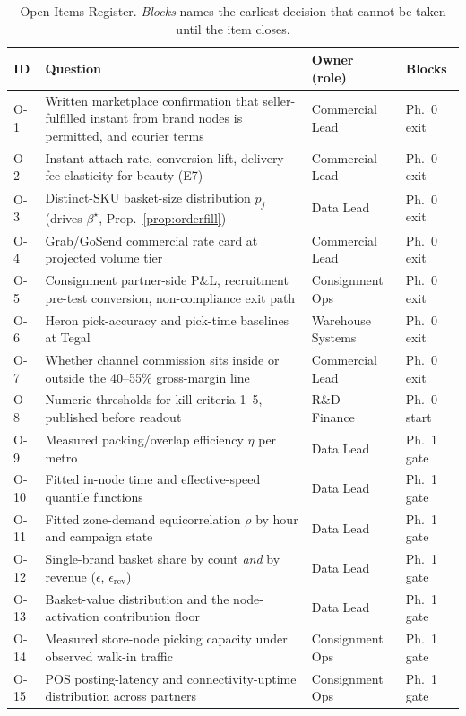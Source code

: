 \documentclass[10pt,twocolumn,letterpaper]{article}
\theoremstyle{definition}
\begin{document}
\begin{table}[t]
\caption{Open Items Register. \emph{Blocks} names the earliest decision that cannot be taken until the item closes.}
\label{tab:open}
\centering\footnotesize
\begin{tabular}{@{}p{0.5cm}p{4.0cm}p{1.5cm}p{1.0cm}@{}}
\toprule
\textbf{ID} & \textbf{Question} & \textbf{Owner (role)} & \textbf{Blocks}\\
\midrule
O-1 & Written marketplace confirmation that seller-fulfilled instant from brand nodes is permitted, and courier terms & Commercial Lead & Ph.\ 0 exit\\
O-2 & Instant attach rate, conversion lift, delivery-fee elasticity for beauty (E7) & Commercial Lead & Ph.\ 0 exit\\
O-3 & Distinct-SKU basket-size distribution $p_j$ (drives $\beta^\star$, Prop.~\ref{prop:orderfill}) & Data Lead & Ph.\ 0 exit\\
O-4 & Grab/GoSend commercial rate card at projected volume tier & Commercial Lead & Ph.\ 0 exit\\
O-5 & Consignment partner-side P\&L, recruitment pre-test conversion, non-compliance exit path & Consignment Ops & Ph.\ 0 exit\\
O-6 & Heron pick-accuracy and pick-time baselines at Tegal & Warehouse Systems & Ph.\ 0 exit\\
O-7 & Whether channel commission sits inside or outside the 40--55\% gross-margin line & Commercial Lead & Ph.\ 0 exit\\
O-8 & Numeric thresholds for kill criteria 1--5, published before readout & R\&D + Finance & Ph.\ 0 start\\
\midrule
O-9 & Measured packing/overlap efficiency $\eta$ per metro & Data Lead & Ph.\ 1 gate\\
O-10 & Fitted in-node time and effective-speed quantile functions & Data Lead & Ph.\ 1 gate\\
O-11 & Fitted zone-demand equicorrelation $\rho$ by hour and campaign state & Data Lead & Ph.\ 1 gate\\
O-12 & Single-brand basket share by count \emph{and} by revenue ($\epsilon$, $\epsilon_{\mathrm{rev}}$) & Data Lead & Ph.\ 1 gate\\
O-13 & Basket-value distribution and the node-activation contribution floor & Data Lead & Ph.\ 1 gate\\
O-14 & Measured store-node picking capacity under observed walk-in traffic & Consignment Ops & Ph.\ 1 gate\\
O-15 & POS posting-latency and connectivity-uptime distribution across partners & Consignment Ops & Ph.\ 1 gate\\

\end{tabular}
\end{table}
\end{document}
